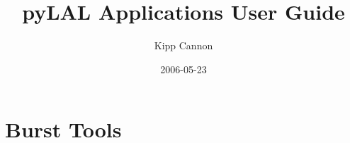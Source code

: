 \documentclass{book}
\title{pyLAL Applications User Guide}
\author{Kipp Cannon}	%
\date{2006-05-23}
\begin{document}
\maketitle
\tableofcontents
\listoftables
\listoffigures

\chapter{Burst Tools}


\end{document}
